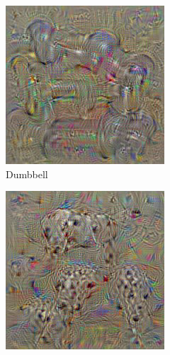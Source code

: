 \begin{figure}[t]
  \captionsetup[subfigure]{labelformat=empty}
  \begin{subfigure}[b]{0.3\textwidth}
    \includegraphics[width=\textwidth]{gfx/deep-visualization-class-1}
    \caption{Dumbbell}
    \label{fig:sec:context:deep-visualization-class-1}
  \end{subfigure}
  \hfill
  \begin{subfigure}[b]{0.3\textwidth}
    \includegraphics[width=\textwidth]{gfx/deep-visualization-class-2}

\end{subfigure}
\end{figure}
